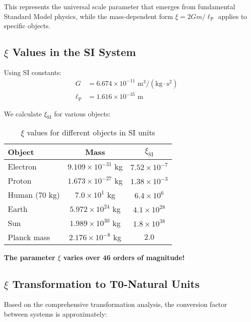 \documentclass[12pt,a4paper]{article}
\newcommand{\xipar}{\xi}
\newcommand{\lP}{\ell_{\text{P}}}
\begin{document}
	This represents the universal scale parameter that emerges from fundamental Standard Model physics, while the mass-dependent form $\xipar = 2Gm/\lP$ applies to specific objects.
	
	\subsection{$\xipar$ Values in the SI System}
	\label{subsec:xi_si_values}
	
	Using SI constants:
	\begin{align}
		G &= 6.674 \times 10^{-11} \text{ m}^3/(\text{kg} \cdot \text{s}^2) \\
		\lP &= 1.616 \times 10^{-35} \text{ m}
	\end{align}
	
	We calculate $\xipar_{\text{SI}}$ for various objects:
	
	\begin{table}[htbp]
		\centering
		\begin{tabular}{lcc}
			\toprule
			\textbf{Object} & \textbf{Mass} & \textbf{$\xipar_{\text{SI}}$} \\
			\midrule
			Electron & $9.109 \times 10^{-31}$ kg & $7.52 \times 10^{-7}$ \\
			Proton & $1.673 \times 10^{-27}$ kg & $1.38 \times 10^{-3}$ \\
			Human (70 kg) & $7.0 \times 10^{1}$ kg & $6.4 \times 10^{6}$ \\
			Earth & $5.972 \times 10^{24}$ kg & $4.1 \times 10^{28}$ \\
			Sun & $1.989 \times 10^{30}$ kg & $1.8 \times 10^{38}$ \\
			Planck mass & $2.176 \times 10^{-8}$ kg & $2.0$ \\
			\bottomrule
		\end{tabular}
		\caption{$\xipar$ values for different objects in SI units}
		\label{tab:xi_si_values}
	\end{table}
	
	\textbf{The parameter $\xipar$ varies over 46 orders of magnitude!}
	
	\subsection{$\xipar$ Transformation to T0-Natural Units}
	\label{subsec:xi_transformation}
	
	Based on the comprehensive transformation analysis, the conversion factor between systems is approximately:
	
\end{document}

